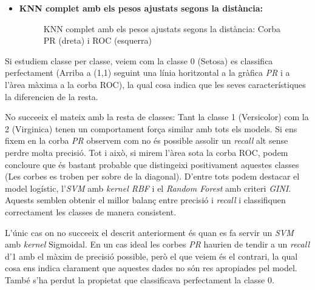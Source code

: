\documentclass[a4paper, 11pt]{article}
\begin{document}
\begin{itemize}
            \item \textbf{KNN complet amb els pesos ajustats segons la distància:}


                \begin{figure}[H]%
                \centering
                \qquad
                \caption*{KNN complet amb els pesos ajustats segons la distància: Corba PR (dreta) i ROC (esquerra)}
                \end{figure}
        \end{itemize}

        Si estudiem classe per classe, veiem com la classe 0 (Setosa) es classifica perfectament
        (Arriba a (1,1) seguint una línia horitzontal a la gràfica \textit{PR} i a l'àrea màxima a la corba
        ROC), la qual cosa indica que les seves característiques la diferencien de la resta.

        No succeeix el mateix amb la resta de classes: Tant la classe 1 (Versicolor) com la 2
        (Virginica) tenen un comportament força similar amb tots els models. Si ens fixem en la
        corba \textit{PR} observem com no és possible assolir un \textit{recall} alt sense perdre molta
        precisió. Tot i això, si mirem l'àrea sota la corba ROC, podem concloure que és bastant
        probable que distingeixi positivament aquestes classes (Les corbes es troben per sobre de
        la diagonal).
        D'entre tots podem destacar el model logístic, l'\textit{SVM} amb \textit{kernel RBF} i el \textit{Random
        Forest} amb criteri \textit{GINI}. Aquests semblen obtenir el millor balanç entre precisió i
        \textit{recall} i classifiquen correctament les classes de manera consistent.

        L'únic cas on no succeeix el descrit anteriorment és quan es fa servir un \textit{SVM} amb \textit{kernel}
        Sigmoidal. En un cas ideal les corbes \textit{PR} haurien de tendir a un \textit{recall} d'1 amb el
        màxim de precisió possible, però el que veiem és el contrari, la qual cosa ens indica
        clarament que aquestes dades no són res apropiades pel model. També s'ha perdut la propietat
         que classificava perfectament la classe 0.
\end{document}

